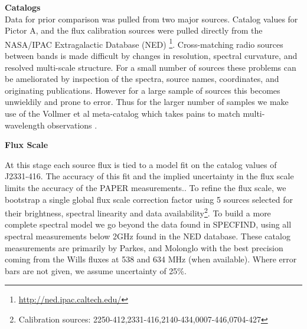 \documentclass[preprint]{aastex}
\begin{document}

\textbf{Catalogs}\\

Data for prior comparison was pulled from two major sources. Catalog values for
Pictor A, and the flux calibration sources were pulled directly from the
NASA/IPAC Extragalactic Database (NED)
\footnote{\url{http://ned.ipac.caltech.edu/}}. Cross-matching radio sources
between bands is made difficult by changes in resolution, spectral curvature,
and resolved multi-scale structure.  For a small number of sources these
problems can be ameliorated by inspection of the spectra, source names,
coordinates,  and originating publications. However for a large sample of
sources this becomes unwieldily and prone to error. Thus for the larger number
of samples we make use of the Vollmer et al meta-catalog which takes pains to
match multi-wavelength observations \citep{Vollmer:2010p6422}.


\textbf{Flux Scale}\\
\label{sec:flux_scale}

At this stage each source flux is tied to a model fit on the catalog values of
J2331-416. The accuracy of this fit and the implied uncertainty in the flux
scale limits the accuracy of the PAPER measurements..  To refine the flux
scale, we bootstrap a single global flux scale correction factor using 5
sources selected for their brightness, spectral linearity and data
availability\footnote{Calibration sources:
2250-412,2331-416,2140-434,0007-446,0704-427}. To build a more complete
spectral model we go beyond the data found in SPECFIND, using all spectral
measurements below 2GHz found in the NED database.  These catalog measurements
are primarily by Parkes, and Molonglo with the best precision coming from the
Wills fluxes at 538 and 634 MHz (when available). Where error bars are not
given, we assume uncertainty of 25\%. 
\end{document}
